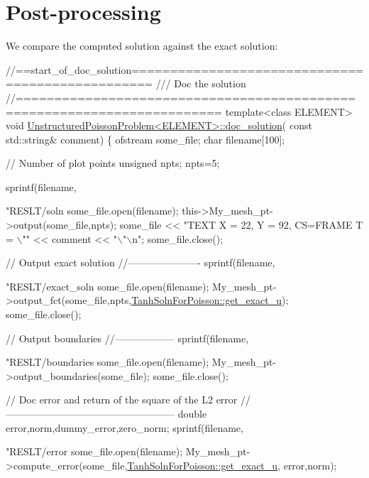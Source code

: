  

\hypertarget{index_doc}{}\section{Post-\/processing}\label{index_doc}
We compare the computed solution against the exact solution\+:


\begin{DoxyCodeInclude}
\textcolor{comment}{//==start\_of\_doc\_solution=================================================}
\textcolor{comment}{/// Doc the solution}
\textcolor{comment}{}\textcolor{comment}{//========================================================================}
\textcolor{keyword}{template}<\textcolor{keyword}{class} ELEMENT>
\textcolor{keywordtype}{void} \hyperlink{classUnstructuredPoissonProblem_a9b21a3c3f574da71411f852006fe2a0c}{UnstructuredPoissonProblem<ELEMENT>::doc\_solution}(\textcolor{keyword}{
      const} 
                                                       std::string& comment)
\{ 
 ofstream some\_file;
 \textcolor{keywordtype}{char} filename[100];
 
 \textcolor{comment}{// Number of plot points}
 \textcolor{keywordtype}{unsigned} npts;
 npts=5; 
 
 sprintf(filename,\textcolor{stringliteral}{"RESLT/soln%
 some\_file.open(filename);
 this->My\_mesh\_pt->output(some\_file,npts); 
 some\_file << \textcolor{stringliteral}{"TEXT X = 22, Y = 92, CS=FRAME T = \(\backslash\)""} 
           << comment << \textcolor{stringliteral}{"\(\backslash\)"\(\backslash\)n"};
 some\_file.close();
 
 \textcolor{comment}{// Output exact solution }
 \textcolor{comment}{//----------------------}
 sprintf(filename,\textcolor{stringliteral}{"RESLT/exact\_soln%
 some\_file.open(filename);
 My\_mesh\_pt->output\_fct(some\_file,npts,\hyperlink{namespaceTanhSolnForPoisson_af7896e9c18ce6438c73ae2a875e8b7de}{TanhSolnForPoisson::get\_exact\_u}); 
 some\_file.close();
 
 \textcolor{comment}{// Output boundaries}
 \textcolor{comment}{//------------------}
 sprintf(filename,\textcolor{stringliteral}{"RESLT/boundaries%
 some\_file.open(filename);
 My\_mesh\_pt->output\_boundaries(some\_file);
 some\_file.close();


 \textcolor{comment}{// Doc error and return of the square of the L2 error}
 \textcolor{comment}{//---------------------------------------------------}
 \textcolor{keywordtype}{double} error,norm,dummy\_error,zero\_norm;
 sprintf(filename,\textcolor{stringliteral}{"RESLT/error%
 some\_file.open(filename);
 My\_mesh\_pt->compute\_error(some\_file,\hyperlink{namespaceTanhSolnForPoisson_af7896e9c18ce6438c73ae2a875e8b7de}{TanhSolnForPoisson::get\_exact\_u},
                           error,norm); 
 
}}}}
\end{DoxyCodeInclude}
